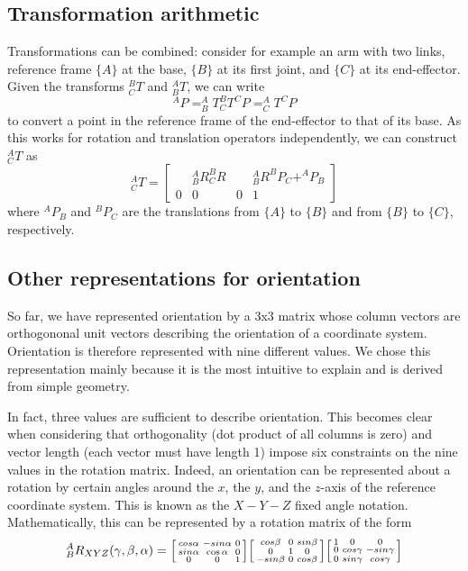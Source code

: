 \subsection{Transformation arithmetic}
Transformations can be combined: consider for example an arm with two links, reference frame $\{A\}$ at the base, $ \{B\} $ at its first joint, and $\{C\}$ at its end-effector. Given the transforms $ ^B_CT$ and $ ^A_BT$, we can write
\begin{equation}
^AP=^A_BT^B_CT^CP=^A_CT^CP
\end{equation}
to convert a point in the reference frame of the end-effector to that of its base. As this works for rotation and translation operators independently, we can construct $ ^A_CT$ as
\begin{equation}
^A_CT=\left[\begin{array}{ccc|c} & ^A_BR^B_CR & & ^A_BR^BP_C +^AP_B \\\hline 0 & 0 & 0 & 1\end{array}\right]
\end{equation}
%
where $ ^AP_B$ and $ ^BP_C$ are the translations from $\{A\}$ to $\{B\}$ and from $ \{B\}$ to $\{C\}$, respectively.

\subsection{Other representations for orientation}
So far, we have represented orientation by a 3x3 matrix whose column vectors are orthogononal unit vectors describing the orientation of a coordinate system. Orientation is therefore represented with nine different values. We chose this representation mainly because it is the most intuitive to explain and is derived from simple geometry.

In fact, three values are sufficient to describe orientation. This becomes clear when considering that orthogonality (dot product of all columns is zero) and vector length (each vector must have length 1) impose six constraints on the nine values in the rotation matrix. Indeed, an orientation can be represented about a rotation by certain angles around the $x$, the $y$, and the $z$-axis of the reference coordinate system. This is known as the $X-Y-Z$ fixed angle notation. Mathematically, this can be represented by a rotation matrix of the form
\begin{equation}
^A_BR_{XYZ}(\gamma,\beta,\alpha)=\begin{bsmallmatrix}cos\alpha & -sin\alpha & 0\\sin\alpha & \cos\alpha & 0\\0 & 0 & 1\end{bsmallmatrix}\begin{bsmallmatrix}cos\beta& 0 & sin\beta\\0 & 1 & 0\\-sin\beta & 0 & cos\beta\end{bsmallmatrix}\begin{bsmallmatrix}1 & 0 & 0 \\ 0 & cos\gamma & -sin\gamma\\0 & sin\gamma & cos\gamma\end{bsmallmatrix}
\end{equation}

